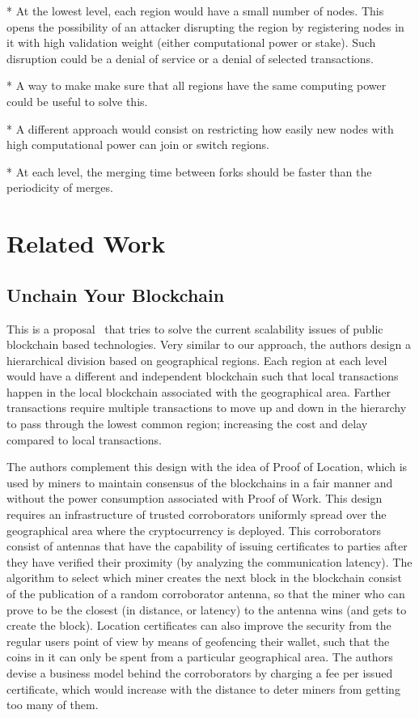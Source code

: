 * At the lowest level, each region would have a small number of nodes.  This
opens the possibility of an attacker disrupting the region by registering nodes
in it with high validation weight (either computational power or stake).  Such
disruption could be a denial of service or a denial of selected transactions.

* A way to make make sure that all regions have the same computing power could be
useful to solve this.

* A different approach would consist on restricting how easily new nodes with
high computational power can join or switch regions.

* At each level, the merging time between forks should be faster than the
periodicity of merges.

\section{Related Work}

\subsection{Unchain Your Blockchain}

This is a proposal~\cite{unchain} that tries to solve the current scalability
issues of public blockchain based technologies.  Very similar to our approach,
the authors design a hierarchical division based on geographical regions.  Each
region at each level would have a different and independent blockchain such
that local transactions happen in the local blockchain associated with the
geographical area.  Farther transactions require multiple transactions to move
up and down in the hierarchy to pass through the lowest common region;
increasing the cost and delay compared to local transactions.


The authors complement this design with the idea of Proof of Location, which is
used by miners to maintain consensus of the blockchains in a fair manner and
without the power consumption associated with Proof of Work.  This design
requires an infrastructure of trusted corroborators uniformly spread over the
geographical area where the cryptocurrency is deployed.  This corroborators
consist of antennas that have the capability of issuing certificates to parties
after they have verified their proximity (by analyzing the communication
latency).  The algorithm to select which miner creates the next block in the
blockchain consist of the publication of a random corroborator antenna, so that
the miner who can prove to be the closest (in distance, or latency) to the
antenna wins (and gets to create the block).  Location certificates can also
improve the security from the regular users point of view by means of
geofencing their wallet, such that the coins in it can only be spent from a
particular geographical area.  The authors devise a business model behind the
corroborators by charging a fee per issued certificate, which would increase
with the distance to deter miners from getting too many of them.


